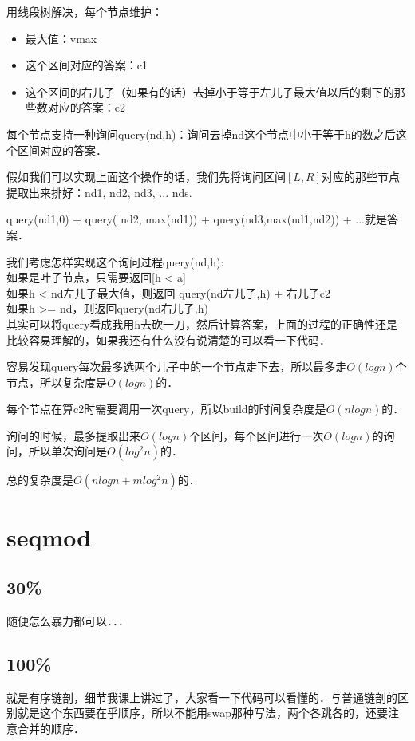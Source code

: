 \documentclass{article}
\begin{document}
		用线段树解决，每个节点维护：
		
		\begin{itemize}
			\item 最大值：vmax
			\item 这个区间对应的答案：c1
			\item 这个区间的右儿子（如果有的话）去掉小于等于左儿子最大值以后的剩下的那些数对应的答案：c2
		\end{itemize}
		
		每个节点支持一种询问query(nd,h)：询问去掉nd这个节点中小于等于h的数之后这个区间对应的答案．
		
		假如我们可以实现上面这个操作的话，我们先将询问区间$[L,R]$对应的那些节点提取出来排好：nd1, nd2, nd3, ... nds.
		
		query(nd1,0) + query( nd2, max(nd1)) + query(nd3,max(nd1,nd2)) + ...就是答案．
		
		我们考虑怎样实现这个询问过程query(nd,h):\\
			\quad  如果是叶子节点，只需要返回[h < a]	　\\
			\quad  如果h < nd左儿子最大值，则返回 query(nd左儿子,h) + 右儿子c2	\\
			\quad  如果h >= nd，则返回query(nd右儿子,h)	\\

		其实可以将query看成我用h去砍一刀，然后计算答案，上面的过程的正确性还是比较容易理解的，如果我还有什么没有说清楚的可以看一下代码．
		
		容易发现query每次最多选两个儿子中的一个节点走下去，所以最多走$O(logn)$个节点，所以复杂度是$O(logn)$的．
		
		每个节点在算c2时需要调用一次query，所以build的时间复杂度是$O(nlogn)$的．
		
		询问的时候，最多提取出来$O(logn)$个区间，每个区间进行一次$O(logn)$的询问，所以单次询问是$O(log^2n)$的．
		
		总的复杂度是$O(nlogn+mlog^2n)$的．
		
		\newpage 
		
	\section{seqmod}
		\subsection{30\%}
		
		随便怎么暴力都可以．．．
		
		\subsection{100\%}
		
		就是有序链剖，细节我课上讲过了，大家看一下代码可以看懂的．与普通链剖的区别就是这个东西要在乎顺序，所以不能用swap那种写法，两个各跳各的，还要注意合并的顺序．
		
\end{document}
